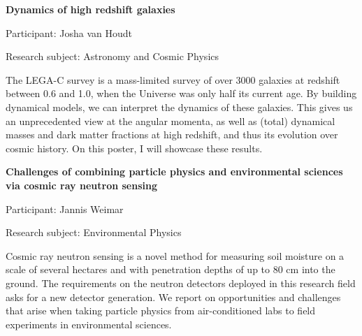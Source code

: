 \begin{minipage}[t]{1.0\textwidth}

\begin{center}

{{\large\bfseries Dynamics of high redshift galaxies}\par}

\end{center}

{\noindent Participant: Josha van Houdt\par} 

{\noindent Research subject: Astronomy and Cosmic Physics\par}\medskip

\noindent The LEGA-C survey is a mass-limited survey of over 3000 galaxies at redshift between 0.6 and 1.0, when the Universe was only half its current age. By building dynamical models, we can interpret the dynamics of these galaxies. This gives us an unprecedented view at the angular momenta, as well as (total) dynamical masses and dark matter fractions at high redshift, and thus its evolution over cosmic history. On this poster, I will showcase these results. \par\end{minipage}

\hfill 

\begin{minipage}[t]{1.0\textwidth}

\begin{center}

{{\large\bfseries Challenges of combining particle physics and environmental sciences via cosmic ray neutron sensing}\par}

\end{center}

{\noindent Participant: Jannis Weimar\par} 

{\noindent Research subject: Environmental Physics\par}\medskip

\noindent Cosmic ray neutron sensing is a novel method for measuring soil moisture on a scale of several hectares and with penetration depths of up to 80 cm into the ground. The requirements on the neutron detectors deployed in this research field asks for a new detector generation. We report on opportunities and challenges that arise when taking particle physics from air-conditioned labs to field experiments in environmental sciences.\par\end{minipage}


